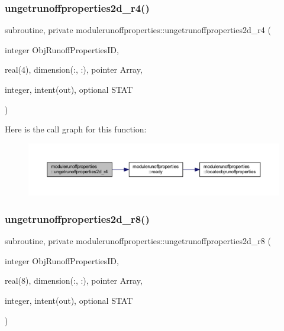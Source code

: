 \subsubsection{\texorpdfstring{ungetrunoffproperties2d\+\_\+r4()}{ungetrunoffproperties2d\_r4()}}
{\footnotesize\ttfamily subroutine, private modulerunoffproperties\+::ungetrunoffproperties2d\+\_\+r4 (\begin{DoxyParamCaption}\item[{integer}]{Obj\+Runoff\+Properties\+ID,  }\item[{real(4), dimension(\+:, \+:), pointer}]{Array,  }\item[{integer, intent(out), optional}]{S\+T\+AT }\end{DoxyParamCaption})\hspace{0.3cm}{\ttfamily [private]}}

Here is the call graph for this function\+:\nopagebreak
\begin{figure}[H]
\begin{center}
\leavevmode
\includegraphics[width=350pt]{namespacemodulerunoffproperties_a85270cee7ca1e6d07d2853a9380f1987_cgraph}
\end{center}
\end{figure}
\mbox{\label{namespacemodulerunoffproperties_abb57930bec871aba1885b2ccb5a1eaee}} 
\subsubsection{\texorpdfstring{ungetrunoffproperties2d\+\_\+r8()}{ungetrunoffproperties2d\_r8()}}
{\footnotesize\ttfamily subroutine, private modulerunoffproperties\+::ungetrunoffproperties2d\+\_\+r8 (\begin{DoxyParamCaption}\item[{integer}]{Obj\+Runoff\+Properties\+ID,  }\item[{real(8), dimension(\+:, \+:), pointer}]{Array,  }\item[{integer, intent(out), optional}]{S\+T\+AT }\end{DoxyParamCaption})\hspace{0.3cm}{\ttfamily [private]}}


